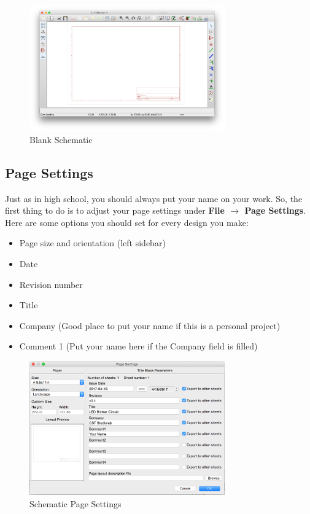 \documentclass[12pt, oneside]{article}
\begin{document}
\begin{figure}[H]
\includegraphics[width=0.75\textwidth]{BlankSchematic}
\centering
\caption{Blank Schematic}
\end{figure}

\subsection{Page Settings}
Just as in high school, you should always put your name on your work. So, the first thing to do is to adjust your page settings under \textbf{File $\rightarrow$ Page Settings}. Here are some options you should set for every design you make:
\begin{itemize}
	\item Page size and orientation (left sidebar)
	\item Date
	\item Revision number
	\item Title
	\item Company (Good place to put your name if this is a personal project)
	\item Comment 1 (Put your name here if the Company field is filled)
\end{itemize}

\begin{figure}[H]
\includegraphics[width=0.75\textwidth]{PageSettings}
\centering
\caption{Schematic Page Settings}
\end{figure}
\end{document}

